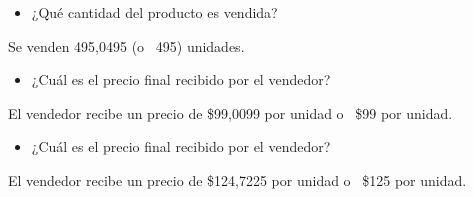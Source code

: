 \documentclass[12pt,dvipsnames]{article}
\begin{document}
\begin{itemize}
	\item ¿Qué cantidad del producto es vendida?
\end{itemize}	
Se venden 495,0495 (o ~495) unidades.
\begin{itemize}
	\item ¿Cuál es el precio final recibido por el vendedor? 
\end{itemize}	
El vendedor recibe un precio de \$99,0099 por unidad o ~\$99 por unidad.
\begin{itemize} 
	\item ¿Cuál es el precio final recibido por el vendedor? 
\end{itemize}	
El vendedor recibe un precio de \$124,7225 por unidad o ~\$125 por unidad.
\end{document}
